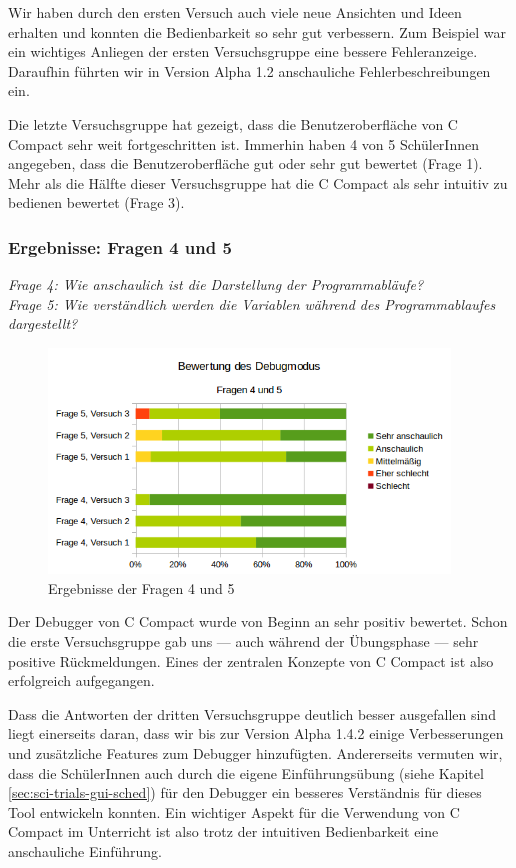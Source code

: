 Wir haben durch den ersten Versuch auch viele neue Ansichten und Ideen erhalten und konnten die Bedienbarkeit so sehr gut verbessern. Zum Beispiel war ein wichtiges Anliegen der ersten Versuchsgruppe eine bessere Fehleranzeige. Daraufhin führten wir in Version Alpha 1.2 anschauliche Fehlerbeschreibungen ein.

Die letzte Versuchsgruppe hat gezeigt, dass die Benutzeroberfläche von C Compact sehr weit fortgeschritten ist. Immerhin haben 4 von 5 SchülerInnen angegeben, dass die Benutzeroberfläche \glqq{}gut\grqq{} oder \glqq{}sehr gut\grqq{} bewertet (Frage 1). Mehr als die Hälfte dieser Versuchsgruppe hat die C Compact als \glqq{}sehr intuitiv zu bedienen\grqq{} bewertet (Frage 3).

\subsubsection*{Ergebnisse: Fragen 4 und 5}

\emph{Frage 4: Wie anschaulich ist die Darstellung der Programmabläufe?\\
Frage 5: Wie verständlich werden die Variablen während des Programmablaufes dargestellt?}

\begin{figure}[h!]
\centering
\includegraphics[width=0.95\textwidth]{./media/images/gui/trials/gui-f4-5.png}
\caption{Ergebnisse der Fragen 4 und 5}
\end{figure}

Der Debugger von C Compact wurde von Beginn an sehr positiv bewertet. Schon die erste Versuchsgruppe gab uns --- auch während der Übungsphase --- sehr positive Rückmeldungen. Eines der zentralen Konzepte von C Compact ist also erfolgreich aufgegangen.

Dass die Antworten der dritten Versuchsgruppe deutlich besser ausgefallen sind liegt einerseits daran, dass wir bis zur Version Alpha 1.4.2 einige Verbesserungen und zusätzliche Features zum Debugger hinzufügten. Andererseits vermuten wir, dass die SchülerInnen auch durch die eigene Einführungsübung (siehe Kapitel \ref{sec:sci-trials-gui-sched}) für den Debugger ein besseres Verständnis für dieses Tool entwickeln konnten. Ein wichtiger Aspekt für die Verwendung von C Compact im Unterricht ist also trotz der intuitiven Bedienbarkeit eine anschauliche Einführung.

